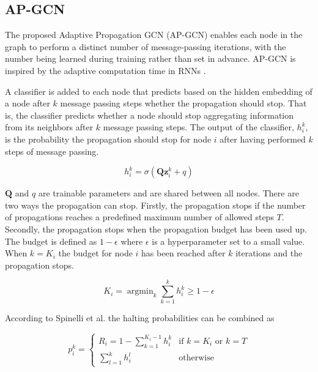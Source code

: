 \documentclass{gdl}
\begin{document}
\subsection{AP-GCN}
The proposed Adaptive Propagation GCN (AP-GCN) enables each node in the graph to perform a distinct number of message-passing iterations, with the number being learned during training rather than set in advance. AP-GCN is inspired by the adaptive computation time in RNNs \cite{graves2017}.

A classifier is added to each node that predicts based on the hidden embedding of a node after $k$ message passing steps whether the propagation should stop. That is, the classifier predicts whether a node should stop aggregating information from its neighbors after $k$ message passing steps. The output of the classifier, $h^k_i$, is the probability the propagation should stop for node $i$ after having performed $k$ steps of message passing.

$$h^k_i = \sigma(\textbf{Q}\textbf{z}^k_i + q)$$

\noindent $\textbf{Q}$ and $q$ are trainable parameters and are shared between all nodes. There are two ways the propagation can stop. Firstly, the propagation stops if the number of propagations reaches a predefined maximum number of allowed steps $T$. Secondly, the propagation stops when the propagation budget has been used up. The budget is defined as $1-\epsilon$ where $\epsilon$ is a hyperparameter set to a small value. When $k=K_i$ the budget for node $i$ has been reached after $k$ iterations and the propagation stops. 

\begin{equation}
    K_i = \mathop{\arg\min}_{k} \sum_{k=1}^{k} h_i^k \geq 1-\epsilon
\end{equation}

\noindent According to Spinelli et al. the halting probabilities can be combined as

\begin{equation}
    p_i^k = 
    \begin{cases}
    R_i = 1 - \sum_{k=1}^{K_i - 1} h_i^k & \text{if } k = K_i \text{ or } k = T \\
    \sum_{l=1}^{k} h_i^l & \text{otherwise}
    \end{cases}
    \label{eq:p}
\end{equation}
\end{document}
